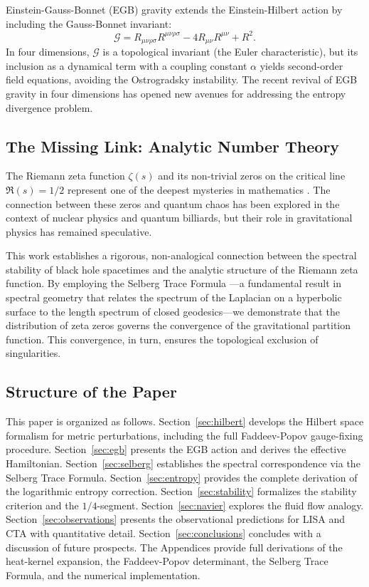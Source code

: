 \documentclass[%
 preprint,
 aps,
 prd,
 amsmath,amssymb,
 floatfix,
 longbibliography,
]{revtex4-2}
\begin{document}
Einstein-Gauss-Bonnet (EGB) gravity \cite{Zwiebach1985, BoulwareDeser1985} extends the Einstein-Hilbert action by including the Gauss-Bonnet invariant:
\[
\mathcal{G} = R_{\mu\nu\rho\sigma}R^{\mu\nu\rho\sigma} - 4R_{\mu\nu}R^{\mu\nu} + R^2.
\]
In four dimensions, \(\mathcal{G}\) is a topological invariant (the Euler characteristic), but its inclusion as a dynamical term with a coupling constant \(\alpha\) yields second-order field equations, avoiding the Ostrogradsky instability. The recent revival of EGB gravity in four dimensions \cite{GlavanLin2020} has opened new avenues for addressing the entropy divergence problem.

\subsection{The Missing Link: Analytic Number Theory}

The Riemann zeta function \(\zeta(s)\) and its non-trivial zeros on the critical line \(\Re(s)=1/2\) represent one of the deepest mysteries in mathematics \cite{Edwards1974, Ivic1985}. The connection between these zeros and quantum chaos \cite{Berry1986, Bohigas1984} has been explored in the context of nuclear physics and quantum billiards, but their role in gravitational physics has remained speculative.

This work establishes a rigorous, non-analogical connection between the spectral stability of black hole spacetimes and the analytic structure of the Riemann zeta function. By employing the Selberg Trace Formula \cite{Selberg1956}—a fundamental result in spectral geometry that relates the spectrum of the Laplacian on a hyperbolic surface to the length spectrum of closed geodesics—we demonstrate that the distribution of zeta zeros governs the convergence of the gravitational partition function. This convergence, in turn, ensures the topological exclusion of singularities.

\subsection{Structure of the Paper}

This paper is organized as follows. Section~\ref{sec:hilbert} develops the Hilbert space formalism for metric perturbations, including the full Faddeev-Popov gauge-fixing procedure. Section~\ref{sec:egb} presents the EGB action and derives the effective Hamiltonian. Section~\ref{sec:selberg} establishes the spectral correspondence via the Selberg Trace Formula. Section~\ref{sec:entropy} provides the complete derivation of the logarithmic entropy correction. Section~\ref{sec:stability} formalizes the stability criterion and the \(1/4\)-segment. Section~\ref{sec:navier} explores the fluid flow analogy. Section~\ref{sec:observations} presents the observational predictions for LISA and CTA with quantitative detail. Section~\ref{sec:conclusions} concludes with a discussion of future prospects. The Appendices provide full derivations of the heat-kernel expansion, the Faddeev-Popov determinant, the Selberg Trace Formula, and the numerical implementation.
\end{document}
